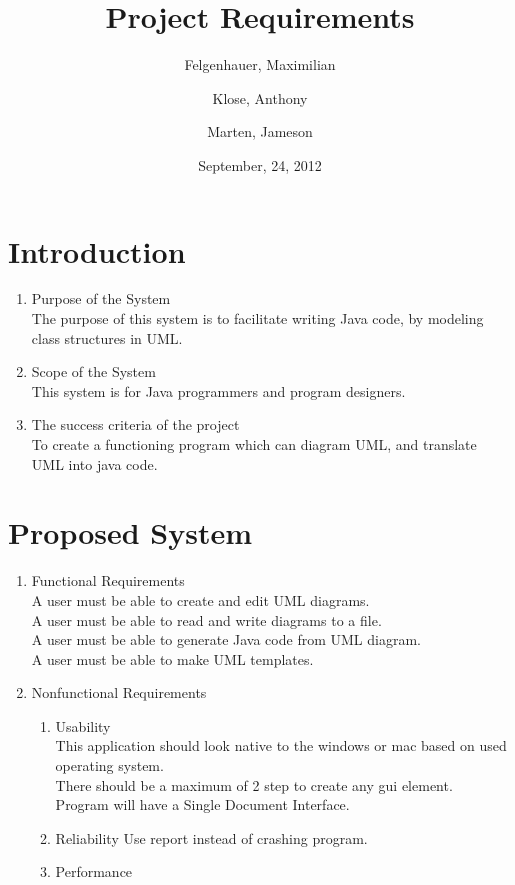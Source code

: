 \documentclass[a4paper, 12pt]{article}
\begin{document}
\title{Project Requirements}
\author{Felgenhauer, Maximilian\\
  \and
  Klose, Anthony\\
  \and
  Marten, Jameson}
\date{September, 24, 2012}

\maketitle

\section{Introduction}

\begin{enumerate}
\item{Purpose of the System}\\
  The purpose of this system is to facilitate writing Java code, by modeling class structures in UML.

\item{Scope of the System}\\
  This system is for Java programmers and program designers.

\item{The success criteria of the project}\\
  To create a functioning program which can diagram UML, and translate UML into java code.
\end{enumerate}

\section{Proposed System}

\begin{enumerate}
\item{Functional Requirements}\\
  A user must be able to create and edit UML diagrams.\\
  A user must be able to read and write diagrams to a file.\\
  A user must be able to generate Java code from UML diagram.\\
  A user must be able to make UML templates.\\

\item{Nonfunctional Requirements}
  \begin{enumerate}
  \item{Usability}\\
    This application should look native to the windows or mac based on used operating system.\\
    There should be a maximum of 2 step to create any gui element. \\
    Program will have a Single Document Interface.\\

  \item{Reliability}
    Use report instead of crashing program.\\

  \item{Performance}
  \end{enumerate}
\end{enumerate}
\end{document}
